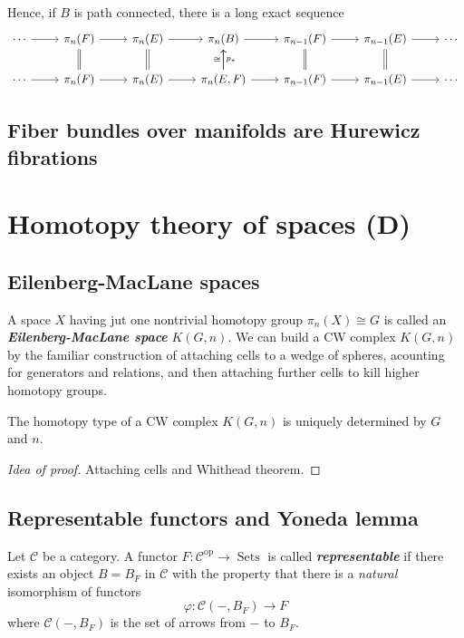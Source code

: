 \begin{remark}
\begin{defn}
\begin{thm}[Hatcher 4.41]
	Hence, if $B$ is path connected, there is a long exact sequence
\[\begin{tikzcd}
	\cdots\arrow[r]&\pi_n(F)\arrow[r]&\pi_n(E)\arrow[r]&\pi_n(B)\arrow[r]&\pi_{n-1}(F)\arrow[r]&\pi_{n-1}(E)\arrow[r]&\cdots\\
	\cdots\arrow[r]&\pi_n(F)\arrow[r]\arrow[u,equals]&\pi_n(E)\arrow[r]\arrow[u,equals]&\pi_n(E,F)\arrow[r]\arrow[u,"\cong "]\arrow[u,swap,"p_{*}"]&\pi_{n-1}(F)\arrow[r]\arrow[u,equals]&\pi_{n-1}(E)\arrow[r]\arrow[u,equals]&\cdots
\end{tikzcd}\]
\end{thm}

\subsection{Fiber bundles over manifolds are Hurewicz fibrations}

\section{Homotopy theory of spaces (D)}

\subsection{Eilenberg-MacLane spaces}
A space $X$ having jut one nontrivial homotopy group $\pi_{n}(X)\cong G$ is called an \textit{\textbf{Eilenberg-MacLane space}} $K(G,n)$. We can build a CW complex $K(G,n)$ by the familiar construction of attaching cells to a wedge of spheres, acounting for generators and relations, and then attaching further cells to kill higher homotopy groups.

\begin{prop}[4.30]
	The homotopy type of a CW complex $K(G,n)$ is uniquely determined by $G$ and $n$.
\end{prop}
\begin{proof}[Idea of proof]
	Attaching cells and Whithead theorem.
\end{proof}

\subsection{Representable functors and Yoneda lemma}

\begin{defn}
	Let $\mathcal{C}$ be a category. A functor $F:\mathcal{C}^{\operatorname{op}}\to \operatorname{Sets}$ is called \textit{\textbf{representable}} if there exists an object $B=B_{F}$ in $\mathcal{C}$ with the property that there is a \textit{natural} isomorphism of functors
	\[\varphi:\mathcal{C}(-,B_{F})\to F\]
	where $\mathcal{C}(-,B_{F})$ is the set of arrows from $-$ to $B_{F}$.


\end{defn}
\end{defn}
\end{remark}
